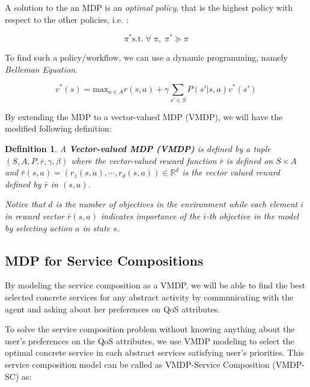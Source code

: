 \documentclass{sigchi}
\newtheorem{definition}{Definition}
\begin{document}
A solution to the an MDP is an \emph{optimal policy}, that is the highest policy with respect to the other policies, i.e. : 

\begin{equation}
\pi^* \text{s.t.} \; \forall \; \pi, \; \pi^* \succeq \pi
\end{equation}

To find such a policy/workflow, we can use a dynamic programming, namely \emph{Belleman Equation}.

\begin{equation}
v^*(s) = \text{max}_{a \in A} r(s,a) + \gamma \sum_{s' \in S} P(s'|s,a) v^*(s')
\end{equation}

By extending the MDP to a vector-valued MDP (VMDP), we will have the modified following definition: 

\begin{definition}
A \textbf{Vector-valued MDP (VMDP)} is defined by a tuple $ (S, A, P, \bar{r}, \gamma, \beta)$ where the vector-valued reward function $\bar{r}$ is defined on $S \times A$ and $\bar{r}(s, a) = (r_1(s,a), \cdots, r_d(s,a)) \in \mathbb{R}^d$ is the vector valued reward defined by $\bar{r}$ in $(s,a)$. 

Notice that $d$ is the number of objectives in the environment while each element $i$ in reward vector $\bar{r}(s, a)$ indicates importance of the $i$-th objective in the model by selecting action $a$ in state $s$. 
\end{definition}

\subsection{MDP for Service Compositions}

By modeling the service composition as a VMDP, we will be able to find the best selected concrete services for any abstract activity by communicating with the agent and asking about her preferences on QoS attributes. 

To solve the service composition problem without knowing anything about the user's preferences on the QoS attributes, we use VMDP modeling to select the optimal concrete service in each abstract services satisfying user's priorities. This service composition model can be called as VMDP-Service Composition (VMDP-SC) as:
\end{document}
